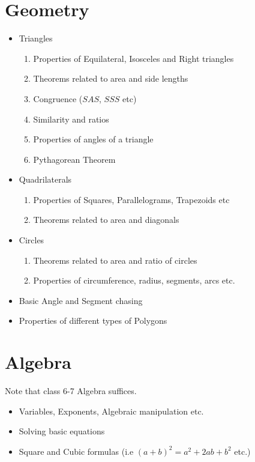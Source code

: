 \documentclass[oneside]{book}
\begin{document}
 \section{Geometry}
 \begin{itemize}
     \item Triangles
        \begin{enumerate}
            \item Properties of Equilateral, Isosceles and Right triangles
            \item Theorems related to area and side lengths
            \item Congruence ($SAS$, $SSS$ etc)
            \item Similarity and ratios
            \item Properties of angles of a triangle
            \item Pythagorean Theorem
        \end{enumerate}
    \item Quadrilaterals
        \begin{enumerate}
            \item Properties of Squares, Parallelograms, Trapezoids etc
            \item Theorems related to area and diagonals
        \end{enumerate}
    \item Circles
        \begin{enumerate}
            \item Theorems related to area and ratio of circles
            \item Properties of circumference, radius, segments, arcs etc.
        \end{enumerate}
    \item Basic Angle and Segment chasing
    \item Properties of different types of Polygons
 \end{itemize}
 
 \section{Algebra}
 Note that class 6-7 Algebra suffices.
\begin{itemize}
    \item Variables, Exponents, Algebraic manipulation etc.
    \item Solving basic equations
    \item Square and Cubic formulas (i.e $(a+b)^2 = a^2 + 2ab + b^2$ etc.)
 \end{itemize}
\end{document}

